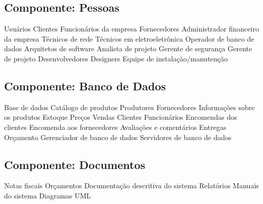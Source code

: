      \subsection{Componente: Pessoas}
	\begin{outline}
	\1 Usuários
	\1 Clientes
	\1 Funcionários da empresa
	\1 Fornecedores 
	\1 Administrador financeiro da empresa
	\1 Técnicos de rede
	\1 Técnicos em eletroeletrônica
	\1 Operador de banco de dados
	\1 Arquitetos de software
	\1 Analista de projeto
	\1 Gerente de segurança
	\1 Gerente de projeto
	\1 Desenvolvedores
	\1 Designers
	\1 Equipe de instalação/manutenção
	\end{outline}
     \subsection{Componente: Banco de Dados}
	\begin{outline}
	\1 Base de dados
		\2 Catálogo de produtos
		\2 Produtores
		\2 Fornecedores
		\2 Informações sobre os produtos
		\2 Estoque
		\2 Preços
		\2 Vendas
		\2 Clientes
		\2 Funcionários 
		\2 Encomendas dos clientes
		\2 Encomenda aos fornecedores
		\2 Avaliações e comentários
		\2 Entregas
		\2 Orçamento
	\1 Gerenciador de banco de dados
	\1 Servidores de banco de dados
	\end{outline}
     \subsection{Componente: Documentos }
	\begin{outline}
	\1 Notas fiscais
	\1 Orçamentos
	\1 Documentação descritiva do sistema
	\1 Relatórios
	\1 Manuais do sistema  
	\1 Diagramas UML
	\end{outline}
